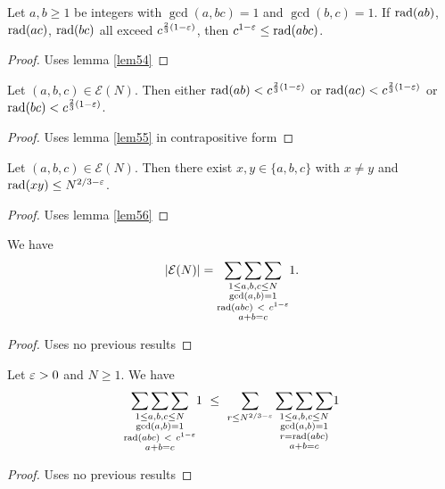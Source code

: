\begin{lemma} \label{lem55} 
Let $a,b\ge1$ be integers with $\gcd(a,bc)=1$ and $\gcd(b,c)=1$. If $\operatorname{rad}(ab)$, $\operatorname{rad}(ac)$, $\operatorname{rad}(bc)$ all exceed $c^{\frac{2}{3}(1-\varepsilon)}$, then $c^{1-\varepsilon}\le\operatorname{rad}(abc)$.
\end{lemma}
\begin{proof}\leanok
{}
Uses lemma \ref{lem54}
\end{proof}


\begin{lemma} \label{lem56} 
Let $(a,b,c)\in \mathcal E(N)$. Then either $\operatorname{rad}(ab)<c^{\frac{2}{3}(1-\varepsilon)}$ or $\operatorname{rad}(ac)<c^{\frac{2}{3}(1-\varepsilon)}$ or $\operatorname{rad}(bc)<c^{\frac{2}{3}(1-\varepsilon)}$.
\end{lemma}
\begin{proof}\leanok
{}
Uses lemma \ref{lem55} in contrapositive form
\end{proof}

\begin{lemma} \label{lem57} 
Let $(a,b,c)\in \mathcal E(N)$. Then there exist $x,y\in \{a,b,c\}$ with $x\neq y$ and $\operatorname{rad}(xy)\le N^{2/3-\varepsilon}$.
\end{lemma}
\begin{proof}\leanok
{}
Uses lemma \ref{lem56}
\end{proof}

\begin{lemma} \label{lem58} 
We have
\[
|\mathcal E(N)| = \underset{\substack{1\le a,b,c\le N\\ \gcd(a,b)=1\\ \operatorname{rad}(abc) \ < \ c^{1-\varepsilon} \\ a+b=c}}{\sum\sum\sum} 1.
\]
\end{lemma}
\begin{proof}\leanok
{}
Uses no previous results
\end{proof}

\begin{lemma} \label{lem59} 
Let $\varepsilon>0$ and $N\ge1$. We have
\[
\underset{\substack{1\le a,b,c\le N\\ \gcd(a,b)=1\\ \operatorname{rad}(abc) \ < \ c^{1-\varepsilon} \\ a+b=c}}{\sum\sum\sum} 1
\ \le \ \sum_{r\le N^{2/3-\varepsilon}}\underset{\substack{1\le a,b,c\le N\\ \gcd(a,b)=1\\ r=\operatorname{rad}(abc) \\ a+b=c}}{\sum\sum\sum} 1
\]
\end{lemma}
\begin{proof}\leanok
{}
Uses no previous results
\end{proof}


